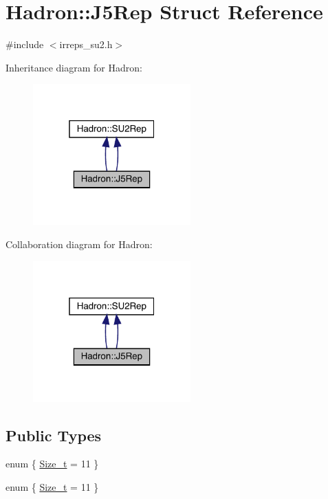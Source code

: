 \hypertarget{structHadron_1_1J5Rep}{}\section{Hadron\+:\+:J5\+Rep Struct Reference}
\label{structHadron_1_1J5Rep}


{\ttfamily \#include $<$irreps\+\_\+su2.\+h$>$}



Inheritance diagram for Hadron\+:\nopagebreak
\begin{figure}[H]
\begin{center}
\leavevmode
\includegraphics[width=172pt]{d8/d65/structHadron_1_1J5Rep__inherit__graph}
\end{center}
\end{figure}


Collaboration diagram for Hadron\+:\nopagebreak
\begin{figure}[H]
\begin{center}
\leavevmode
\includegraphics[width=172pt]{d9/da1/structHadron_1_1J5Rep__coll__graph}
\end{center}
\end{figure}
\subsection*{Public Types}
\begin{DoxyCompactItemize}
\item 
enum \{ \mbox{\hyperlink{structHadron_1_1J5Rep_a0f98a17d4fdd9263395f110f308934c5a114ac1ed2dab800e721cda73a81aba18}{Size\+\_\+t}} = 11
 \}
\item 
enum \{ \mbox{\hyperlink{structHadron_1_1J5Rep_a0f98a17d4fdd9263395f110f308934c5a114ac1ed2dab800e721cda73a81aba18}{Size\+\_\+t}} = 11
 \}
\end{DoxyCompactItemize}
